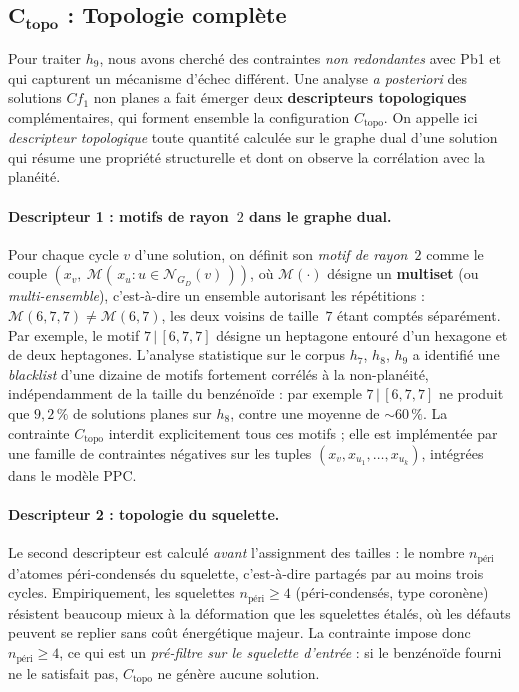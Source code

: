 \documentclass[11pt,a4paper]{article}
\newcommand{\GD}{\ensuremath{G_D}}                 %
\begin{document}
\subsection{$\mathbf{C_{\text{topo}}}$ : Topologie complète}
\label{sec:ctopo}

Pour traiter $h_9$, nous avons cherché des contraintes \emph{non
redondantes} avec Pb1 et qui capturent un mécanisme d'échec différent. Une
analyse \emph{a posteriori} des solutions $Cf_1$ non planes a fait émerger
deux \textbf{descripteurs topologiques} complémentaires, qui forment ensemble la
configuration $C_{\text{topo}}$. On appelle ici \emph{descripteur topologique}
toute quantité calculée sur le graphe dual d'une solution qui résume une
propriété structurelle et dont on observe la corrélation avec la planéité.

\paragraph{Descripteur 1 : motifs de rayon~$2$ dans le graphe dual.}
Pour chaque cycle $v$ d'une solution, on définit son \emph{motif de
rayon~$2$} comme le couple
$(x_v,\ \mathcal{M}(\,x_u : u \in \mathcal{N}_{\GD}(v)\,))$,
où $\mathcal{M}(\cdot)$ désigne un \textbf{multiset} (ou \emph{multi-ensemble}),
c'est-à-dire un ensemble autorisant les répétitions : $\mathcal{M}(6,7,7)
\neq \mathcal{M}(6,7)$, les deux voisins de taille~$7$ étant comptés
séparément.
Par exemple, le motif $7\,|\,[6,7,7]$ désigne un heptagone entouré d'un
hexagone et de deux heptagones. L'analyse statistique sur le corpus $h_7$,
$h_8$, $h_9$ a identifié une \emph{blacklist} d'une dizaine de motifs
fortement corrélés à la non-planéité, indépendamment de la taille du
benzénoïde : par exemple $7\,|\,[6,7,7]$ ne produit que $9{,}2\,\%$ de
solutions planes sur $h_8$, contre une moyenne de $\sim$$60\,\%$. La
contrainte $C_{\text{topo}}$ interdit explicitement tous ces motifs ;
elle est implémentée par une famille de contraintes négatives sur les
tuples $(x_v, x_{u_1}, \dots, x_{u_k})$, intégrées dans le modèle PPC.

\paragraph{Descripteur 2 : topologie du squelette.}
Le second descripteur est calculé \emph{avant} l'assignment des tailles :
le nombre $n_{\text{péri}}$ d'atomes péri-condensés du squelette, c'est-à-dire
partagés par au moins trois cycles. Empiriquement, les squelettes
$n_{\text{péri}} \ge 4$ (péri-condensés, type coronène) résistent
beaucoup mieux à la déformation que les squelettes étalés, où les défauts
peuvent se replier sans coût énergétique majeur. La contrainte impose donc
$n_{\text{péri}} \ge 4$, ce qui est un \emph{pré-filtre sur le squelette
d'entrée} : si le benzénoïde fourni ne le satisfait pas, $C_{\text{topo}}$
ne génère aucune solution.
\end{document}
